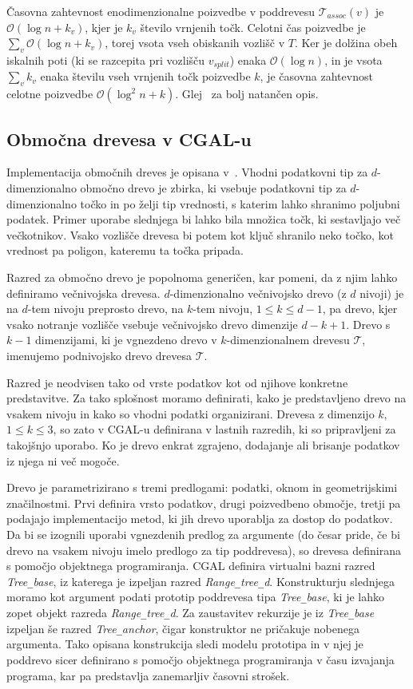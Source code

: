 \documentclass[a4paper, 12pt]{book}
\newcommand{\T}{\ensuremath{\mathcal{T}}}
\newcommand{\OO}{\ensuremath{\mathcal{O}}} %
\newcommand{\U}{\texttt{\_}}
\begin{document}
Časovna zahtevnost enodimenzionalne poizvedbe v poddrevesu $\T_{assoc}(v)$ je $\OO(\log n + k_v)$, kjer je $k_v$ število vrnjenih točk. Celotni čas poizvedbe je $\sum_v\OO(\log n + k_v)$, torej vsota vseh obiskanih vozlišč v $T$. Ker je dolžina obeh iskalnih poti (ki se razcepita pri vozlišču $v_{split}$) enaka $\OO(\log n)$, in je vsota $\sum_v k_v$ enaka številu vseh vrnjenih točk poizvedbe $k$, je časovna zahtevnost celotne poizvedbe $\OO(\log^2n + k)$. Glej~\cite[poglavje 5.3]{bkos-08-all} za bolj natančen opis.

\subsection{Območna drevesa v CGAL-u}
Implementacija območnih dreves je opisana v~\cite{cgal:n-rstd-15a}.
Vhodni podatkovni tip za $d$-dimenzionalno območno drevo je zbirka, ki vsebuje podatkovni tip za $d$-dimenzionalno točko in po želji tip vrednosti, s katerim lahko shranimo poljubni podatek. Primer uporabe slednjega bi lahko bila množica točk, ki sestavljajo več večkotnikov. Vsako vozlišče drevesa bi potem kot ključ shranilo neko točko, kot vrednost pa poligon, kateremu ta točka pripada. 

Razred za območno drevo je popolnoma generičen, kar pomeni, da z njim lahko definiramo večnivojska drevesa. $d$-dimenzionalno večnivojsko drevo  (z $d$ nivoji) je na $d$-tem nivoju preprosto drevo, na $k$-tem nivoju, $1 \leq k \leq d-1$, pa drevo, kjer vsako notranje vozlišče vsebuje večnivojsko drevo dimenzije $d-k+1$. Drevo s $k-1$ dimenzijami, ki je vgnezdeno drevo v $k$-dimenzionalnem drevesu \T, imenujemo podnivojsko drevo drevesa \T. 

Razred je neodvisen tako od vrste podatkov kot od njihove konkretne predstavitve. Za tako splošnost moramo definirati, kako je predstavljeno drevo na vsakem nivoju in kako so vhodni podatki organizirani. Drevesa z dimenzijo $k$, $ 1 \le k \le 3$, so zato v CGAL-u definirana v lastnih razredih, ki so pripravljeni za takojšnjo uporabo. Ko je drevo enkrat zgrajeno, dodajanje ali brisanje podatkov iz njega ni več mogoče.

\bigbreak
Drevo je parametrizirano s tremi predlogami: podatki, oknom in geometrijskimi značilnostmi. Prvi definira vrsto podatkov, drugi poizvedbeno območje, tretji pa podajajo implementacijo metod, ki jih drevo uporablja za dostop do podatkov. Da bi se izognili uporabi vgnezdenih predlog za argumente (do česar pride, če bi drevo na vsakem nivoju imelo predlogo za tip poddrevesa), so drevesa definirana s pomočjo objektnega programiranja. CGAL definira virtualni bazni razred \textit{Tree\U base}, iz katerega je izpeljan razred \textit{Range\U tree\U d}. Konstrukturju slednjega moramo kot argument podati prototip poddrevesa tipa \textit{Tree\U base}, ki je lahko zopet objekt razreda \textit{Range\U tree\U d}. Za zaustavitev rekurzije je iz \textit{Tree\U base} izpeljan še razred \textit{Tree\U anchor}, čigar konstruktor ne pričakuje nobenega argumenta. Tako opisana konstrukcija sledi modelu prototipa in v njej je poddrevo sicer definirano s pomočjo objektnega programiranja v času izvajanja programa, kar pa predstavlja zanemarljiv časovni strošek.
\end{document}
